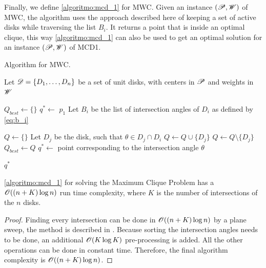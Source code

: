Finally, we define \autoref{algoritmo:mcd_1} for MWC. Given an instance $(\mathscr{P}, \mathscr{W})$ of MWC, the algorithm uses the approach described here of keeping a set of active disks while traversing the list $B_i$. It returns a point that is inside an optimal clique, this way \autoref{algoritmo:mcd_1} can also be used to get an optimal solution for an instance $(\mathscr{P}, \mathscr{W})$ of MCD1.
\clearpage
\begin{algoritmo}[!htb]
	\caption{Algorithm for MWC.}\label{algoritmo:mcd_1}
	\begin{algorithmic}[1]
		
		\item[]
		
		\State Let $\mathscr{D}=\{D_1, \dots, D_n\}$ be a set of unit disks, with centers in $\mathscr{P}$ and weights in $\mathscr{W}$
		
		\State $Q_{best} \gets \{\}$
		\State $q^* \gets$ $p_1$
		\State Let $B_i$ be the list of intersection angles of $D_i$ as defined by \autoref{eq:b_i}
		
		\State $Q \gets \{\}$ 
		\State Let $D_j$ be the disk, such that $\theta \in D_j\cap D_i$
		\State $Q \gets Q \cup \{D_j\}$
		\Else
		\State $Q \gets Q \setminus \{D_j\}$
		\EndIf
		\State $Q_{best} \gets Q$
		\State $q^* \gets$ point corresponding to the intersection angle $\theta$
		\EndIf
		
		\EndFor
		\EndFor
		
		\State \Return $q^*$
		\EndProcedure
	\end{algorithmic}
\end{algoritmo}

\begin{theorem}\label{lema:disk}
	\autoref{algoritmo:mcd_1} for solving the Maximum Clique Problem has a $\mathscr{O}((n+K)\log{n})$ run time complexity, where $K$ is the number of intersections of the $n$ disks.
\end{theorem}

\begin{proof}
	Finding every intersection can be done in $\mathscr{O}((n+K)\log{n})$  by a plane sweep, the method is described in . 
	Because sorting the intersection angles needs to be done, an additional $\mathscr{O}(K\log{K})$ pre-processing is added. All the other operations can be done in constant time. Therefore, the final algorithm complexity is $\mathscr{O}((n+K)\log{n})$.
\end{proof}

